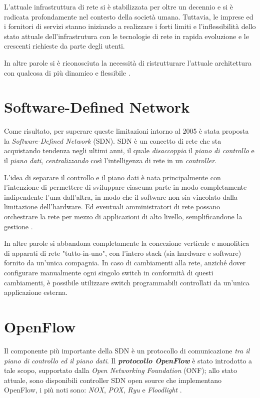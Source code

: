 L'attuale infrastruttura di rete si è stabilizzata per oltre un decennio e si è radicata profondamente nel contesto della società umana. Tuttavia, le imprese ed i fornitori di servizi stanno iniziando a realizzare i forti limiti e l'inflessibilità dello stato attuale dell'infrastrutura con le tecnologie di rete in rapida evoluzione e le crescenti richieste da parte degli utenti.

In altre parole si è riconosciuta la necessità di ristrutturare l'attuale architettura con qualcosa di più dinamico e flessibile \cite{suh2014building}.

\section{Software-Defined Network}\label{sdn}
Come risultato, per superare queste limitazioni intorno al 2005 è stata proposta la \textit{Software-Defined Network} (SDN). SDN è un concetto di rete che sta acquistando tendenza negli ultimi anni, il quale \textit{disaccoppia} il \textit{piano di controllo} e il \textit{piano dati}, \textit{centralizzando} così l'intelligenza di rete in un \textit{controller}.

L'idea di separare il controllo e il piano dati è nata principalmente con l'intenzione di permettere di sviluppare ciascuna parte in modo completamente indipendente l'una dall'altra, in modo che il software non sia vincolato dalla limitazione dell'hardware. Ed eventuali amministratori di rete possano orchestrare la rete per mezzo di applicazioni di alto livello, semplificandone la gestione \cite{fundation2012software}\cite{suh2014building}.

In altre parole si abbandona completamente la concezione verticale e monolitica di apparati di rete "tutto-in-uno", con l'intero stack (sia hardware e software) fornito da un'unica compagnia.
\newline
\newline
In caso di cambiamenti alla rete, anziché dover configurare manualmente ogni singolo switch in conformità di questi cambiamenti, è possibile utilizzare switch programmabili controllati da un'unica applicazione esterna.

\section{OpenFlow}\label{openflow}
Il componente più importante della SDN è un protocollo di comunicazione \textit{tra il piano di controllo ed il piano dati}. Il \textit{\textbf{protocollo OpenFlow}} è stato introdotto a tale scopo, supportato dalla \textit{Open Networking Foundation} (ONF); allo stato attuale, sono disponibili controller SDN open source che implementano OpenFlow, i più noti sono: \textit{NOX}, \textit{POX}, \textit{Ryu} e \textit{Floodlight} \cite{suh2014building}.

